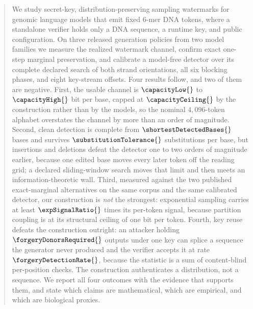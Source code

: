 \begin{abstract}
We study secret-key, distribution-preserving sampling watermarks for genomic language models that
emit fixed 6-mer DNA tokens, where a standalone verifier holds only a DNA sequence, a runtime key, and
public configuration. On three released generation policies from two model families we measure the
realized watermark channel, confirm exact one-step marginal preservation, and calibrate a model-free
detector over its complete declared search of both strand orientations, all six blocking phases, and
eight key-stream offsets. Four results follow, and two of them are negative. First, the usable channel
is $\capacityLow{}$ to $\capacityHigh{}$ bit per base, capped at $\capacityCeiling{}$ by the
construction rather than by the models, so the nominal $4{,}096$-token alphabet overstates the channel
by more than an order of magnitude. Second, clean detection is complete from
$\shortestDetectedBases{}$ bases and survives $\substitutionTolerance{}$ substitutions per base, but
insertions and deletions defeat the detector one to two orders of magnitude earlier, because one
edited base moves every later token off the reading grid; a declared sliding-window search moves that
limit and then meets an information-theoretic wall. Third, measured against the two published
exact-marginal alternatives on the same corpus and the same calibrated detector, our construction is
\emph{not} the strongest: exponential sampling carries at least $\expSignalRatio{}$ times its
per-token signal, because partition coupling is at its structural ceiling of one bit per token.
Fourth, key reuse defeats the construction outright: an attacker holding
$\forgeryDonorsRequired{}$ outputs under one key can splice a sequence the generator never produced
and the verifier accepts it at rate $\forgeryDetectionRate{}$, because the statistic is a sum of
content-blind per-position checks. The construction authenticates a distribution, not a sequence. We
report all four outcomes with the evidence that supports them, and state which claims are
mathematical, which are empirical, and which are biological proxies.
\end{abstract}
